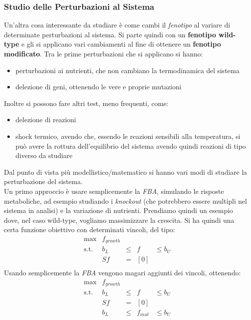 \documentclass[a4paper,12pt, oneside]{book}
\begin{document}
\subsubsection{Studio delle Perturbazioni al Sistema}
Un'altra cosa interessante da studiare è come cambi il \textit{fenotipo} al
variare di determinate perturbazioni al sistema. Si parte quindi con un
\textbf{fenotipo wild-type} e gli si applicano vari cambiamenti al fine di
ottenere un \textbf{fenotipo modificato}. Tra le prime perturbazioni che si
applicano si hanno:
\begin{itemize}
  \item perturbazioni ai nutrienti, che non cambiano la termodinamica del
  sistema 
  \item delezione di geni, ottenendo le vere e proprie mutazioni
\end{itemize}
Inoltre si possono fare altri test, meno frequenti, come:
\begin{itemize}
  \item delezione di reazioni
  \item shock termico, avendo che, essendo le reazioni sensibili alla
  temperatura, si può avere la rottura dell'equilibrio del sistema avendo quindi
  reazioni di tipo diverso da studiare
\end{itemize}
Dal punto di vista più modellistico/matematico si hanno vari modi di studiare la
perturbazione del sistema.\\
Un primo approccio è usare semplicemente la \textit{FBA}, simulando le risposte
metaboliche, ad esempio studiando i \textit{knockout} (che potrebbero essere
multipli nel sistema in analisi) e la variazione di nutrienti. Prendiamo quindi
un esempio dove, nel caso wild-type, vogliamo massimizzare la crescita. Si ha
quindi una certa funzione obiettivo con determinati vincoli, del tipo:
\begin{equation*}
  \begin{array}{rrclcl}
    \displaystyle \max & f_{growth} \\
    \textrm{s.t.} & b_L & \leq & f & \leq b_{U} \\
                       & Sf & = & [0] \\
  \end{array}
\end{equation*}
Usando semplicemente la \textit{FBA} vengono magari aggiunti dei vincoli,
ottenendo:
\begin{equation*}
  \begin{array}{rrclcl}
    \displaystyle \max & f_{growth} \\
    \textrm{s.t.} & b_L & \leq & f & \leq b_{U} \\
                       & Sf & = & [0] \\
                       & b_L & \leq & f_{mut} & \leq b_{U} \\
  \end{array}
\end{equation*}
\end{document}
